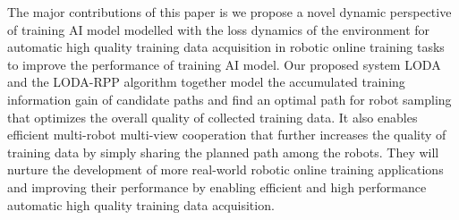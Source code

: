 The major contributions of this paper is we propose a novel dynamic perspective of training AI model modelled with the loss dynamics of the environment for automatic high quality training data acquisition in robotic online training tasks to improve the performance of training AI model.
Our proposed system LODA and the LODA-RPP algorithm together model the accumulated training information gain of candidate paths and find an optimal path for robot sampling that optimizes the overall quality of collected training data.
It also enables efficient multi-robot multi-view cooperation that further increases the quality of training data by simply sharing the planned path among the robots.
They will nurture the development of more real-world robotic online training applications and improving their performance by enabling efficient and high performance automatic high quality training data acquisition.



